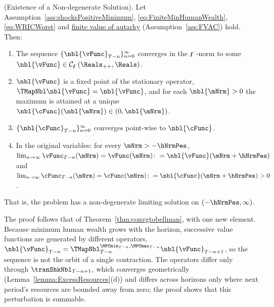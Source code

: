 \documentclass[\econtexRoot/BufferStockTheory]{subfiles}
\begin{document}
\begin{theorem}(Existence of a Non-degenerate Solution).\label{thm:existencePositiveMinimum}
Let Assumption~\ref{ass:shocksPositiveMinimum}, \eqref{eq:FiniteMinHumanWealth}, \eqref{eq:WRICWorst} and \hyperlink{FVAC}{finite value of autarky} (Assumption~\ref{ass:FVAC}) hold.
Then:
\begin{enumerate}[label=(\roman*)]
\item The sequence $\{\nbl{\vFunc}_{T-n}\}_{n=0}^{\infty}$ converges in the $\digamma$-norm to some $\nbl{\vFunc}\in\mathcal{C}_{\boundFunc}(\Reals_{++},\Reals)$.
\item $\nbl{\vFunc}$ is a fixed point of the stationary operator, $\TMapNbl\nbl{\vFunc}=\nbl{\vFunc}$, and for each $\nbl{\mNrm}>0$ the maximum is attained at a unique $\nbl{\cFunc}(\nbl{\mNrm})\in(0,\nbl{\mNrm})$.
\item $\{\nbl{\cFunc}_{T-n}\}_{n=0}^{\infty}$ converges point-wise to $\nbl{\cFunc}$.
\item In the original variables: for every $\mNrm>-\hNrmPes$,
$\lim_{n\rightarrow\infty}\vFunc_{T-n}(\mNrm)=\vFunc(\mNrm)\colon=\nbl{\vFunc}(\mNrm+\hNrmPes)$ and $\lim_{n\rightarrow\infty}\cFunc_{T-n}(\mNrm)=\cFunc(\mNrm)\colon=\nbl{\cFunc}(\mNrm+\hNrmPes)>0$.
\end{enumerate}
That is, the problem has a non-degenerate limiting solution on $(-\hNrmPes,\infty)$.
\end{theorem}

The proof follows that of Theorem~\ref{thm:convgtobellman}, with one new element.
Because minimum human wealth grows with the horizon, successive value functions are generated by different operators, $\nbl{\vFunc}_{T-n}=\TMapNbl_{T-n}^{\MPCmin_{T-n},\MPCmax_{T-n}}\nbl{\vFunc}_{T-n+1}$, so the sequence is not the orbit of a single contraction.
The operators differ only through $\tranShkNbl_{T-n+1}$, which converges geometrically (Lemma~\ref{lemma:ExcessResources}(d)) and differs across horizons only where next period's resources are bounded away from zero; the proof shows that this perturbation is summable.
\end{document}

